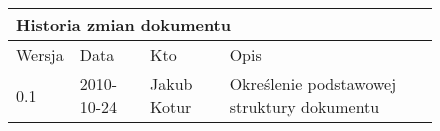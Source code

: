 \begin{figure}[h]
	\centering

\begin{tabular}{|p{}|p{}|p{}|p{}|}
	\hline
	\multicolumn{4}{|l|}{Historia zmian dokumentu} \\
	\hline
	Wersja & Data & Kto & Opis \\
	\hline
	0.1 & 2010-10-24 & Jakub Kotur &
	Określenie podstawowej struktury dokumentu \\
	\hline
\end{tabular}

	\label{tab:metric}
\end{figure}

